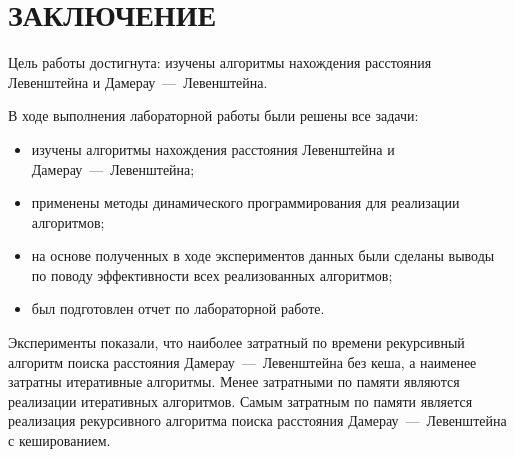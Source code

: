 \section*{ЗАКЛЮЧЕНИЕ}

Цель работы достигнута: изучены алгоритмы нахождения расстояния Левенштейна и Дамерау~---~Левенштейна.

В ходе выполнения лабораторной работы были решены все задачи:
\begin{itemize}
	\item изучены алгоритмы нахождения расстояния Левенштейна и Дамерау~---~Левенштейна;
	\item применены методы динамического программирования для реализации алгоритмов;
	\item на основе полученных в ходе экспериментов данных были сделаны выводы по поводу эффективности всех реализованных алгоритмов;
	\item был подготовлен отчет по лабораторной работе.
\end{itemize}

Эксперименты показали, что наиболее затратный по времени рекурсивный алгоритм поиска расстояния Дамерау~---~Левенштейна без кеша, а наименее затратны итеративные алгоритмы. Менее затратными по памяти являются реализации итеративных алгоритмов. 
Самым затратным по памяти является реализация рекурсивного алгоритма поиска расстояния Дамерау~---~Левенштейна с кешированием. 